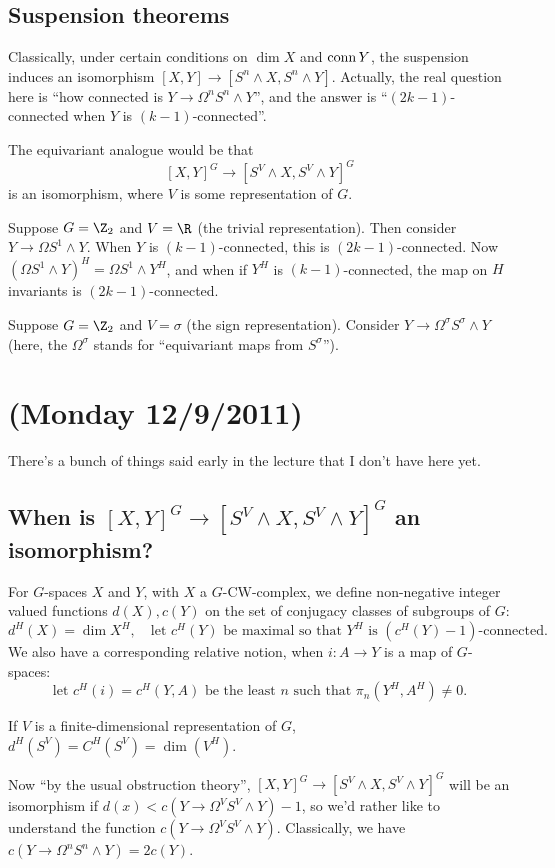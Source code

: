 \documentclass[11pt]{article}
\newcommand{\NewLecture}[3]{\section{#1 {\small(#2/#3/2011)}}}
\begin{document}
\subsection*{Suspension theorems}
Classically, under certain conditions on $\dim X$ and $\operatorname{conn} Y$, the suspension induces an isomorphism $[X,Y]\to[S^n\wedge X,S^n\wedge Y]$. Actually, the real question here is ``how connected is $Y\to \Omega^nS^n\wedge Y$'', and the answer is ``$(2k-1)$-connected when $Y$ is $(k-1)$-connected''.

The equivariant analogue would be that
\[[X,Y]^G\to [S^V\wedge X,S^V\wedge Y]^G\]
is an isomorphism, where $V$ is some representation of $G$.
\begin{exmp*}
Suppose $G=\Z_2$ and $V=\R$ (the trivial representation). Then consider $Y\to\Omega S^1\wedge Y$. When $Y$ is $(k-1)$-connected, this is $(2k-1)$-connected.
Now $(\Omega S^1\wedge Y)^H=\Omega S^1\wedge Y^H$, and when if $Y^H$ is $(k-1)$-connected, the map on $H$ invariants is $(2k-1)$-connected.
\end{exmp*}
\begin{exmp*}
Suppose $G=\Z_2$ and $V=\sigma$ (the sign representation). Consider $Y\to \Omega^\sigma S^\sigma\wedge Y$ (here, the $\Omega^\sigma$ stands for ``equivariant maps from $S^\sigma$'').
\end{exmp*}
\NewLecture{}{Monday 12}{9}
There's a bunch of things said early in the lecture that I don't have here yet.
\subsection*{When is $[X,Y]^G\to[S^V\wedge X,S^V\wedge Y]^G$ an isomorphism?}
For $G$-spaces $X$ and $Y$, with $X$ a $G$-CW-complex, we define non-negative integer valued functions $d(X),c(Y)$ on the set of conjugacy classes of subgroups of $G$:
\[d^H(X)=\dim X^H,\quad \text{let $c^H(Y)$ be maximal so that $Y^H$ is $(c^H(Y)-1)$-connected.}\]
We also have a corresponding relative notion, when $i:A\to Y$ is a map of $G$-spaces:
\[\text{let $c^H(i)=c^H(Y,A)$ be the least $n$ such that $\pi_n(Y^H,A^H)\neq0$.}\]
\begin{exmp*}
If $V$ is a finite-dimensional representation of $G$, $d^H(S^V)=C^H(S^V)=\dim (V^H)$.
\end{exmp*}
Now ``by the usual obstruction theory'', $[X,Y]^G\to[S^V\wedge X,S^V\wedge Y]^G$ will be an isomorphism if $d(x)<c(Y\to\Omega^VS^V\wedge Y)-1$, so we'd rather like to understand the function $c(Y\to\Omega^VS^V\wedge Y)$. Classically, we have $c(Y\to\Omega^nS^n\wedge Y)=2c(Y)$.
\end{document}
